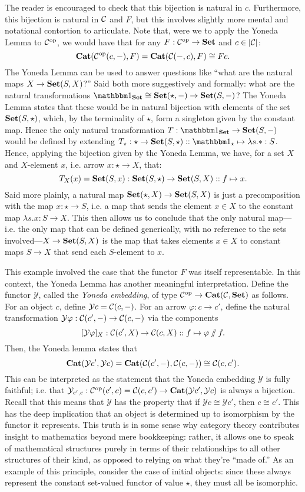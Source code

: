 The reader is encouraged to check that this bijection is natural in $c$. Furthermore, this bijection is natural in $\mathcal{C}$ and $F$, but this involves slightly more mental and notational contortion to articulate. Note that, were we to apply the Yoneda Lemma to $\mathcal{C}^{\text{op}}$, we would have that for any $F:\mathcal{C}^{\text{op}}\to\mathbf{Set}$ and $c\in|\mathcal{C}|$:
\[\mathbf{Cat}(\mathcal{C}^{\text{op}}(c,-),F)=\mathbf{Cat}(\mathcal{C}(-,c),F)\cong Fc.\]
The Yoneda Lemma can be used to answer questions like ``what are the natural maps $X\to\mathbf{Set}(S,X)$?'' Said both more suggestively and formally: what are the natural transformations $\Id{\Set}\cong\Set(\star,-)\to\Set(S,-)$? The Yoneda Lemma states that these would be in natural bijection with elements of the set $\mathbf{Set}(S,\star)$, which, by the terminality of $\star$, form a singleton given by the constant map. Hence the only natural transformation $T:\Id{\Set}\to\Set(S,-)$ would be defined by extending $T_{\star}:\star\to\Set(S,\star)::\Id{\star}\mapsto \lambda s.*:S$. Hence, applying the bijection given by the Yoneda Lemma, we have, for a set $X$ and $X$-element $x$, i.e. arrow $x:\star\to X$, that: \[T_X(x)=\mathbf{Set}(S,x):\mathbf{Set}(S,\star)\to\mathbf{Set}(S,X)::f\mapsto x.\]
Said more plainly, a natural map $\mathbf{Set}(\star,X)\to\mathbf{Set}(S,X)$ is just a precomposition with the map $x:\star\to S$, i.e. a map that sends the element $x\in X$ to the constant map $\lambda s.x: S\to X$. This then allows us to conclude that the only natural map---i.e. the only map that can be defined generically, with no reference to the sets involved---$X\to\mathbf{Set}(S,X)$ is the map that takes elements $x\in X$ to constant maps $S\to X$ that send each $S$-element to $x$.

This example involved the case that the functor $F$ was itself representable. In this context, the Yoneda Lemma has another meaningful interpretation. Define the functor $\mathcal{Y}$, called the \emph{Yoneda embedding}, of type $\mathcal{C}^{\text{op}}\to\mathbf{Cat}(\mathcal{C},\mathbf{Set})$ as follows. For an object $c$, define $\mathcal{Y}c=\mathcal{C}(c,-)$. For an arrow $\varphi : c\to c'$, define the natural transformation $\mathcal{Y}\varphi:\mathcal{C}(c',-)\to\mathcal{C}(c,-)$ via the components \[[\mathcal{Y}\varphi]_X:\mathcal{C}(c',X)\to\mathcal{C}(c,X)::f\mapsto \varphi\sslash f.\]
Then, the Yoneda lemma states that
\[\mathbf{Cat}(\mathcal{Y}c',\mathcal{Y}c)=\mathbf{Cat}(\mathcal{C}(c',-),\mathcal{C}(c,-))\cong\mathcal{C}(c,c').\]
This can be interpreted as the statement that the Yoneda embedding $\mathcal{Y}$ is fully faithful; i.e. that $\mathcal{Y}_{c',c}:\mathcal{C}^{\text{op}}(c',c)=\mathcal{C}(c,c')\to\mathbf{Cat}(\mathcal{Y} c',\mathcal{Y} c)$ is always a bijection. Recall that this means that $\mathcal{Y}$ has the property that if $\mathcal{Y}c\cong\mathcal{Y}c'$, then $c\cong c'$. This has the deep implication that an object is determined up to isomorphism by the functor it represents. This truth is in some sense why category theory contributes insight to mathematics beyond mere bookkeeping: rather, it allows one to speak of mathematical structures purely in terms of their relationships to all other structures of their kind, as opposed to relying on what they're ``made of.'' As an example of this principle, consider the case of initial objects: since these always represent the constant set-valued functor of value $\star$, they must all be isomorphic.

